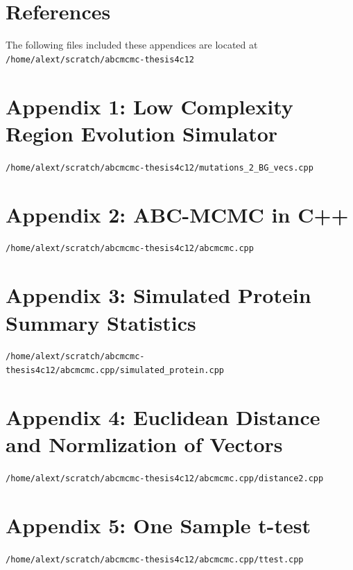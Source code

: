\documentclass[10pt]{article}
\begin{document}
\section{References}


\nocite{*}
\printbibliography[heading=none, sorting=nyt]
\newpage

The following files included these appendices are located at \texttt{/home/alext/scratch/abcmcmc-thesis4c12}

\section{Appendix 1: Low Complexity Region Evolution Simulator}
\texttt{/home/alext/scratch/abcmcmc-thesis4c12/mutations\_2\_BG\_vecs.cpp}

\newpage

\section{Appendix 2: ABC-MCMC in C++}
\texttt{/home/alext/scratch/abcmcmc-thesis4c12/abcmcmc.cpp}

\newpage

\section{Appendix 3: Simulated Protein Summary Statistics}
\texttt{/home/alext/scratch/abcmcmc-thesis4c12/abcmcmc.cpp/simulated\_protein.cpp}

\newpage

\section{Appendix 4: Euclidean Distance and Normlization of Vectors}
\texttt{/home/alext/scratch/abcmcmc-thesis4c12/abcmcmc.cpp/distance2.cpp}

\newpage

\section{Appendix 5: One Sample t-test}
\texttt{/home/alext/scratch/abcmcmc-thesis4c12/abcmcmc.cpp/ttest.cpp}

\newpage
\end{document}

